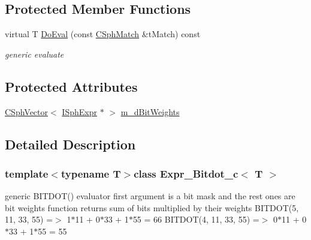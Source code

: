 \subsection*{Protected Member Functions}
\begin{DoxyCompactItemize}
\item 
virtual T \hyperlink{classExpr__Bitdot__c_aed576cbb46e0aab9001c349d18a1eb39}{Do\-Eval} (const \hyperlink{classCSphMatch}{C\-Sph\-Match} \&t\-Match) const 
\begin{DoxyCompactList}\small\item\em generic evaluate \end{DoxyCompactList}\end{DoxyCompactItemize}
\subsection*{Protected Attributes}
\begin{DoxyCompactItemize}
\item 
\hyperlink{classCSphVector}{C\-Sph\-Vector}$<$ \hyperlink{structISphExpr}{I\-Sph\-Expr} $\ast$ $>$ \hyperlink{classExpr__Bitdot__c_a6064486a5ceb303e762cf34c5d5a2abb}{m\-\_\-d\-Bit\-Weights}
\end{DoxyCompactItemize}


\subsection{Detailed Description}
\subsubsection*{template$<$typename T$>$class Expr\-\_\-\-Bitdot\-\_\-c$<$ T $>$}

generic B\-I\-T\-D\-O\-T() evaluator first argument is a bit mask and the rest ones are bit weights function returns sum of bits multiplied by their weights B\-I\-T\-D\-O\-T(5, 11, 33, 55) =$>$ 1$\ast$11 + 0$\ast$33 + 1$\ast$55 = 66 B\-I\-T\-D\-O\-T(4, 11, 33, 55) =$>$ 0$\ast$11 + 0$\ast$33 + 1$\ast$55 = 55 

